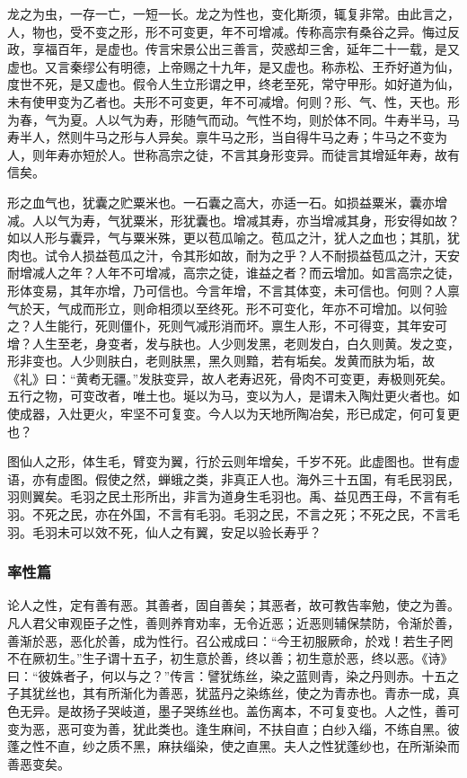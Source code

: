 \documentclass[]{article}
\begin{document}
龙之为虫，一存一亡，一短一长。龙之为性也，变化斯须，辄复非常。由此言之，人，物也，受不变之形，形不可变更，年不可增减。传称高宗有桑谷之异。悔过反政，享福百年，是虚也。传言宋景公出三善言，荧惑却三舍，延年二十一载，是又虚也。又言秦缪公有明德，上帝赐之十九年，是又虚也。称赤松、王乔好道为仙，度世不死，是又虚也。假令人生立形谓之甲，终老至死，常守甲形。如好道为仙，未有使甲变为乙者也。夫形不可变更，年不可减增。何则？形、气、性，天也。形为春，气为夏。人以气为寿，形随气而动。气性不均，则於体不同。牛寿半马，马寿半人，然则牛马之形与人异矣。禀牛马之形，当自得牛马之寿；牛马之不变为人，则年寿亦短於人。世称高宗之徒，不言其身形变异。而徒言其增延年寿，故有信矣。

形之血气也，犹囊之贮粟米也。一石囊之高大，亦适一石。如损益粟米，囊亦增减。人以气为寿，气犹粟米，形犹囊也。增减其寿，亦当增减其身，形安得如故？如以人形与囊异，气与粟米殊，更以苞瓜喻之。苞瓜之汁，犹人之血也；其肌，犹肉也。试令人损益苞瓜之汁，令其形如故，耐为之乎？人不耐损益苞瓜之汁，天安耐增减人之年？人年不可增减，高宗之徒，谁益之者？而云增加。如言高宗之徒，形体变易，其年亦增，乃可信也。今言年增，不言其体变，未可信也。何则？人禀气於天，气成而形立，则命相须以至终死。形不可变化，年亦不可增加。以何验之？人生能行，死则僵仆，死则气减形消而坏。禀生人形，不可得变，其年安可增？人生至老，身变者，发与肤也。人少则发黑，老则发白，白久则黄。发之变，形非变也。人少则肤白，老则肤黑，黑久则黯，若有垢矣。发黄而肤为垢，故《礼》曰：``黄耇无疆。''发肤变异，故人老寿迟死，骨肉不可变更，寿极则死矣。五行之物，可变改者，唯土也。埏以为马，变以为人，是谓未入陶灶更火者也。如使成器，入灶更火，牢坚不可复变。今人以为天地所陶冶矣，形已成定，何可复更也？

图仙人之形，体生毛，臂变为翼，行於云则年增矣，千岁不死。此虚图也。世有虚语，亦有虚图。假使之然，蝉蛾之类，非真正人也。海外三十五国，有毛民羽民，羽则翼矣。毛羽之民土形所出，非言为道身生毛羽也。禹、益见西王母，不言有毛羽。不死之民，亦在外国，不言有毛羽。毛羽之民，不言之死；不死之民，不言毛羽。毛羽未可以效不死，仙人之有翼，安足以验长寿乎？

\hypertarget{header-n80}{%
\subsubsection{率性篇}\label{header-n80}}

论人之性，定有善有恶。其善者，固自善矣；其恶者，故可教告率勉，使之为善。凡人君父审观臣子之性，善则养育劝率，无令近恶；近恶则辅保禁防，令渐於善，善渐於恶，恶化於善，成为性行。召公戒成曰：``今王初服厥命，於戏！若生子罔不在厥初生。''生子谓十五子，初生意於善，终以善；初生意於恶，终以恶。《诗》曰：``彼姝者子，何以与之？''传言：譬犹练丝，染之蓝则青，染之丹则赤。十五之子其犹丝也，其有所渐化为善恶，犹蓝丹之染练丝，使之为青赤也。青赤一成，真色无异。是故扬子哭岐道，墨子哭练丝也。盖伤离本，不可复变也。人之性，善可变为恶，恶可变为善，犹此类也。逢生麻间，不扶自直；白纱入缁，不练自黑。彼蓬之性不直，纱之质不黑，麻扶缁染，使之直黑。夫人之性犹蓬纱也，在所渐染而善恶变矣。
\end{document}

